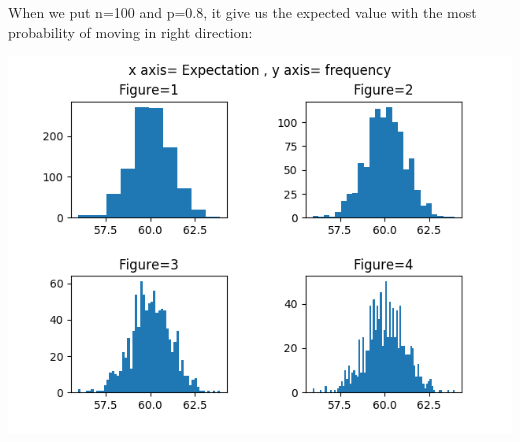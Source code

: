 \documentclass[answers]{exam}
\begin{document}
\begin{framed}
\begin{center}
\end{center}
When we put n=100 and p=0.8, it give us the expected value with the most probability of moving in right direction:\begin{center}
    \includegraphics[scale=0.7]{hist1.1_p=0.8.png}
\end{center}
\end{framed}
\end{document}

